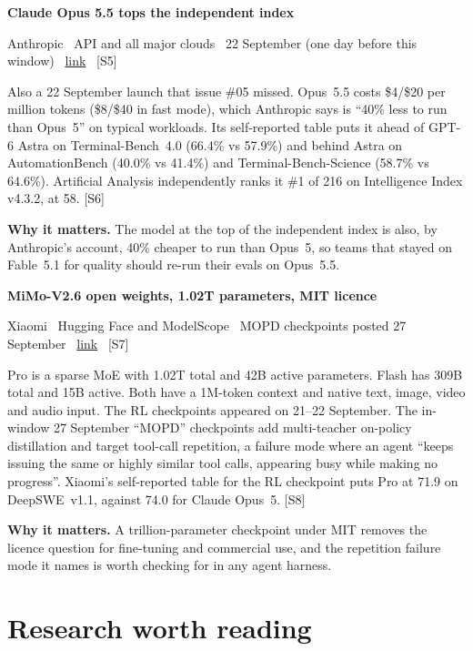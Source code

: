 \documentclass[11pt,a4paper]{article}
\newcommand{\entry}[4]{%
  \par\vspace{0.7em}%
  {\sffamily\bfseries\color{brandink}#1}\par
  {\footnotesize\color{brandgrey}#2 \textbullet\ \href{#3}{link} \textbullet\ \srcref{#4}}\par
  \vspace{0.15em}}
\newcommand{\why}[1]{\par{\small\textbf{Why it matters.} #1}\par}
\newcommand{\srcref}[1]{\textcolor{brandaccent}{[S#1]}}
\begin{document}
\entry{Claude Opus 5.5 tops the independent index}{Anthropic \textbullet\ API and all major clouds \textbullet\ 22 September (one day before this window)}{https://www.anthropic.com/claude-opus-5-5}{5}
Also a 22 September launch that issue \#05 missed. Opus~5.5 costs \$4/\$20 per million tokens
(\$8/\$40 in fast mode), which Anthropic says is ``40\% less to run than Opus~5'' on
typical workloads. Its self-reported table puts it ahead of GPT-6 Astra on Terminal-Bench~4.0
(66.4\% vs 57.9\%) and behind Astra on AutomationBench (40.0\% vs 41.4\%) and Terminal-Bench-Science
(58.7\% vs 64.6\%). Artificial Analysis independently ranks it \#1 of 216 on Intelligence Index
v4.3.2, at 58. \srcref{6}
\why{The model at the top of the independent index is also, by Anthropic's account, 40\% cheaper to run than Opus~5, so teams that stayed on Fable~5.1 for quality should re-run their evals on Opus~5.5.}

\entry{MiMo-V2.6 open weights, 1.02T parameters, MIT licence}{Xiaomi \textbullet\ Hugging Face and ModelScope \textbullet\ MOPD checkpoints posted 27 September}{https://huggingface.co/XiaomiMiMo/MiMo-V2.6-Pro-MOPD}{7}
Pro is a sparse MoE with 1.02T total and 42B active parameters. Flash has 309B total
and 15B active. Both have a 1M-token context and native text, image, video and audio input.
The RL checkpoints appeared on 21--22 September. The in-window 27 September ``MOPD''
checkpoints add multi-teacher on-policy distillation and target tool-call repetition,
a failure mode where an agent ``keeps issuing the same or highly similar tool calls,
appearing busy while making no progress''. Xiaomi's self-reported table for the RL checkpoint puts Pro at
71.9 on DeepSWE~v1.1, against 74.0 for Claude Opus~5. \srcref{8}
\why{A trillion-parameter checkpoint under MIT removes the licence question for fine-tuning and commercial use, and the repetition failure mode it names is worth checking for in any agent harness.}

\section{Research worth reading}
\end{document}
